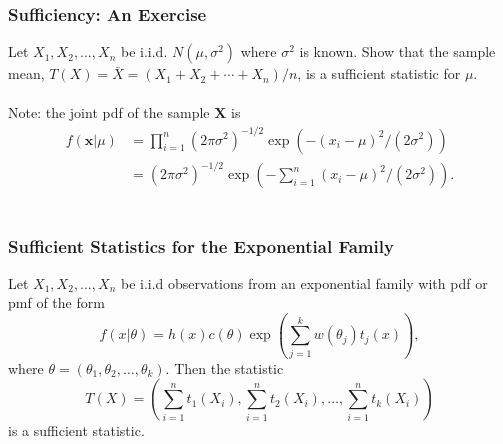 \documentclass{beamer}
\begin{document}
\begin{frame}
\frametitle{Sufficiency: An Exercise}
Let $X_1,X_2,\ldots,X_n$ be i.i.d. $N(\mu,\sigma^2)$ where $\sigma^2$ is known. Show that the sample mean, $T(X) = \bar{X} = (X_1+X_2+\cdots+X_n)/n$, is a sufficient statistic for $\mu$.
\\~\\
Note: the joint pdf of the sample $\mathbf{X}$ is
$$
\begin{aligned}
f(\mathbf{x}|\mu) &= \prod_{i=1}^n (2\pi \sigma^2)^{-1/2} \exp(-(x_i - \mu)^2/(2\sigma^2))\\
&=(2\pi \sigma^2)^{-1/2} \exp(-\sum_{i=1}^n(x_i - \mu)^2/(2\sigma^2)).
\end{aligned}
$$
~\\
\end{frame}


\begin{frame}
\frametitle{Sufficient Statistics for the Exponential Family}
Let $X_1,X_2,\ldots,X_n$ be i.i.d observations from an exponential family with pdf or pmf of the form
$$
f(x|\theta) = h(x)c(\theta)\exp\left(\sum_{j=1}^k w(\theta_j)t_j(x)\right),
$$
where $\theta = (\theta_1,\theta_2,\ldots,\theta_k)$. Then the statistic
$$
T(X) = \left(\sum_{i=1}^n t_1(X_i),\sum_{i=1}^n t_2(X_i),\ldots,\sum_{i=1}^n t_k(X_i)\right)
$$
is a sufficient statistic.
\end{frame}
\end{document}
